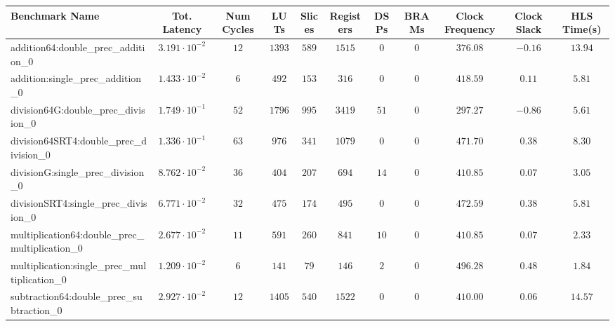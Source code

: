 \begin{tabular}{|l|c|c|c|c|c|c|c|c|c|c|}
\hline
Benchmark Name                                   & Tot. Latency            & Num Cycles & LUTs     & Slices   & Registers & DSPs   & BRAMs & Clock Frequency & Clock Slack & HLS Time(s) \\
\hline
addition64:double\_prec\_addition\_0             & $ 3.191 \cdot 10^{-2} $ & $ 12     $ & $ 1393 $ & $ 589  $ & $ 1515  $ & $ 0  $ & $ 0 $ & $ 376.08      $ & $ -0.16   $ & $ 13.94   $ \\
addition:single\_prec\_addition\_0               & $ 1.433 \cdot 10^{-2} $ & $ 6      $ & $ 492  $ & $ 153  $ & $ 316   $ & $ 0  $ & $ 0 $ & $ 418.59      $ & $ 0.11    $ & $ 5.81    $ \\
division64G:double\_prec\_division\_0            & $ 1.749 \cdot 10^{-1} $ & $ 52     $ & $ 1796 $ & $ 995  $ & $ 3419  $ & $ 51 $ & $ 0 $ & $ 297.27      $ & $ -0.86   $ & $ 5.61    $ \\
division64SRT4:double\_prec\_division\_0         & $ 1.336 \cdot 10^{-1} $ & $ 63     $ & $ 976  $ & $ 341  $ & $ 1079  $ & $ 0  $ & $ 0 $ & $ 471.70      $ & $ 0.38    $ & $ 8.30    $ \\
divisionG:single\_prec\_division\_0              & $ 8.762 \cdot 10^{-2} $ & $ 36     $ & $ 404  $ & $ 207  $ & $ 694   $ & $ 14 $ & $ 0 $ & $ 410.85      $ & $ 0.07    $ & $ 3.05    $ \\
divisionSRT4:single\_prec\_division\_0           & $ 6.771 \cdot 10^{-2} $ & $ 32     $ & $ 475  $ & $ 174  $ & $ 495   $ & $ 0  $ & $ 0 $ & $ 472.59      $ & $ 0.38    $ & $ 5.81    $ \\
multiplication64:double\_prec\_multiplication\_0 & $ 2.677 \cdot 10^{-2} $ & $ 11     $ & $ 591  $ & $ 260  $ & $ 841   $ & $ 10 $ & $ 0 $ & $ 410.85      $ & $ 0.07    $ & $ 2.33    $ \\
multiplication:single\_prec\_multiplication\_0   & $ 1.209 \cdot 10^{-2} $ & $ 6      $ & $ 141  $ & $ 79   $ & $ 146   $ & $ 2  $ & $ 0 $ & $ 496.28      $ & $ 0.48    $ & $ 1.84    $ \\
subtraction64:double\_prec\_subtraction\_0       & $ 2.927 \cdot 10^{-2} $ & $ 12     $ & $ 1405 $ & $ 540  $ & $ 1522  $ & $ 0  $ & $ 0 $ & $ 410.00      $ & $ 0.06    $ & $ 14.57   $ \\

\end{tabular}
